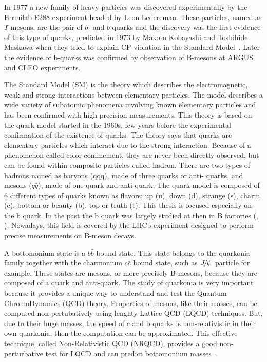 In 1977 a new family of heavy particles was discovered experimentally by the
Fermilab E288 experiment headed by Leon Ledereman\cite{Herb:1977ek}. These
particles, named as $\Upsilon$ mesons, are the pair of $b$- and
$\bar{b}$-quarks and the discovery was the first evidence of this type of
quarks, predicted in 1973 by Makoto Kobayashi and Toshihide Maskawa when they
tried to explain CP violation in the Standard Model~\cite{Kobayashi:1973fv}.
Later the evidence of b-quarks was confirmed by observation of B-mesons at
ARGUS\cite{Albrecht:1986nr} and CLEO\cite{Bebek:1987bp} experiments.

The Standard Model (SM) is the theory which describes the electromagnetic,
weak and strong interactions between elementary particles. The model describes
a wide variety of subatomic phenomena involving known elementary particles and
has been confirmed with high precision measurements. This theory is based on
the quark model started in the 1960s\cite{GellMann:1964nj,Zweig:1981pd}, few
years before the experimental confirmation of the existence of quarks. The
theory says that quarks are elementary particles which interact due to the
strong interaction. Because of a phenomenon called color confinement, they are
never been directly observed,  but can be found within composite particles
called hadron. There are two types of hadrons named as baryons (qqq), made of
three quarks or anti- quarks, and mesons ($q\bar{q}$), made of one quark and
anti-quark. The quark model is composed of 6 different types of quarks known as
flavors: up (u), down (d), strange (s), charm (c), bottom or beauty (b), top or
truth (t). This thesis is focused especially on the b quark. In the past the b
quark was largely studied at \lep then in B factories (\babar, \belle).
Nowadays, this field is covered by the LHCb experiment designed to perform
precise measurements on B-meson decays.

A bottomonium state is a $b\bar{b}$ bound state. This state belongs to the
quarkonia family together with the charmonium $c\bar{c}$ bound
state, such as ${{J\mskip -3mu/\mskip -2mu\psi\mskip 2mu}}$ particle for example. These states are mesons, or more
precisely B-mesons, because they are composed of a quark and anti-quark. The
study of quarkonia is very important because it provides a unique way to
understand and test the Quantum ChromoDynamics (QCD) theory. Properties of
mesons, like their masses, can be computed non-pertubatively using lenghty
Lattice QCD (LQCD) techniques. But, due to their huge masses, the speed of c
and b quarks is non-relativistic in their own quarkonia, then the computation
can be approximated. This effective technique, called Non-Relativistic QCD
(NRQCD), provides a good non-perturbative test for LQCD and can predict
bottomonium masses~\cite{Dowdall:2011iy,Dowdall:2012ab}.

